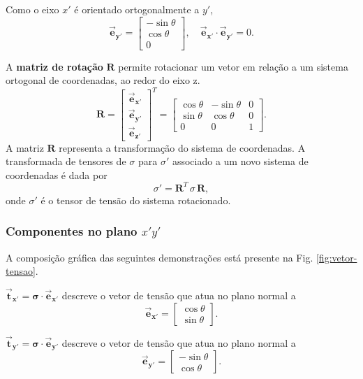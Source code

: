 \documentclass[11pt]{article}
\begin{document}
	Como o eixo $x'$ é orientado ortogonalmente a $y'$,
	\[
	\boldsymbol{\vec{e}_{y'}} =
	\begin{bmatrix}
		-\sin \theta \\
		\cos \theta \\
		0
	\end{bmatrix},\quad \boldsymbol{\vec{e}_{x'}}\cdot \boldsymbol{\vec{e}_{y'}}=0.
	\]
	
	A \textbf{matriz de rotação} $\mathbf{R}$ permite rotacionar um vetor em relação a um sistema ortogonal de coordenadas, ao redor do eixo z.
	\[
	\mathbf{R} =
	\begin{bmatrix}
		\boldsymbol{\vec{e}_{x'}} \\
		\boldsymbol{\vec{e}_{y'}} \\
		\boldsymbol{\vec{e}_{z'}}
	\end{bmatrix}^T
	=
	\begin{bmatrix}
		\cos\theta & -\sin\theta & 0 \\
		\sin\theta & \cos\theta & 0 \\
		0 & 0 & 1
	\end{bmatrix}.
	\]
	A matriz $\mathbf{R}$ representa a transformação do sistema de coordenadas. A transformada de tensores de $\sigma$ para $\sigma'$ associado a um novo sistema de coordenadas é dada por
	\[
		\sigma' = \mathbf{R}^T\, \sigma\, \mathbf{R},
	\]
	onde $\sigma'$ é o tensor de tensão do sistema rotacionado.
	
	\subsubsection{Componentes no plano $x'y'$}
	
	A composição gráfica das seguintes demonstrações está presente na Fig. \ref{fig:vetor-tensao}.
	
	$\boldsymbol{\vec{t}_{x'}}=\mathbf{\sigma}\cdot \boldsymbol{\vec{e}_{x'}}$ descreve o vetor de tensão que atua no plano normal a 
	\[
	\boldsymbol{\vec{e}_{x'}} =
	\begin{bmatrix}
		\cos\theta \\
		\sin\theta
	\end{bmatrix}.
	\]
	
	$\boldsymbol{\vec{t}_{y'}}=\mathbf{\sigma}\cdot \boldsymbol{\vec{e}_{y'}}$ descreve o vetor de tensão que atua no plano normal a 
	\[
	\boldsymbol{\vec{e}_{y'}} =
	\begin{bmatrix}
		-\sin\theta \\
		\cos\theta
	\end{bmatrix}.
	\]
	
\end{document}
